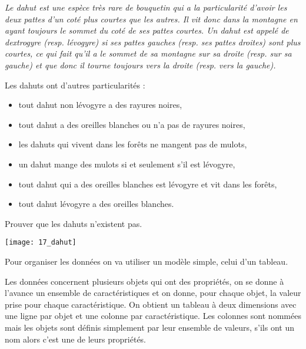 \begin{minipage}{0.7\linewidth}
{\it Le dahut est une espèce très rare de bouquetin qui a la particularité d'avoir les deux pattes d'un coté plus courtes que les autres. Il vit donc dans la montagne en ayant toujours le sommet du coté de ses pattes courtes. Un dahut est appelé de dextrogyre (resp. lévogyre) si ses pattes gauches (resp. ses pattes droites) sont plus courtes, ce qui fait qu'il a le sommet de sa montagne sur sa droite (resp. sur sa gauche) et que donc il tourne toujours vers la droite (resp. vers la gauche).

Les dahuts ont d'autres particularités :
 
\begin{itemize}
\item tout dahut non lévogyre a des rayures noires,
\item tout dahut a des oreilles blanches ou n'a pas de rayures noires,
\item les dahuts qui vivent dans les forêts ne mangent pas de mulots,
\item un  dahut mange des mulots si et seulement s'il est lévogyre,
\item tout dahut qui a des oreilles blanches est lévogyre et vit dans les forêts,
\item tout dahut lévogyre a des oreilles blanches.
\end{itemize}

Prouver que les dahuts n'existent pas.}
\end{minipage}
\begin{minipage}{0.25\linewidth}
\texttt{[image: 17\_dahut]}
\end{minipage}

\medskip

Pour organiser les données on va utiliser un modèle simple, celui d'un tableau.

Les données concernent plusieurs objets qui ont des propriétés, on se donne à l'avance un ensemble de caractéristiques et on donne, pour chaque objet, la valeur prise pour chaque caractéristique. On obtient un tableau à deux dimensions avec une ligne par objet et une colonne par caractéristique. Les colonnes sont nommées mais les objets sont définis simplement par leur ensemble de valeurs, s'ils ont un nom alors c'est une de leurs propriétés.

\newpage

